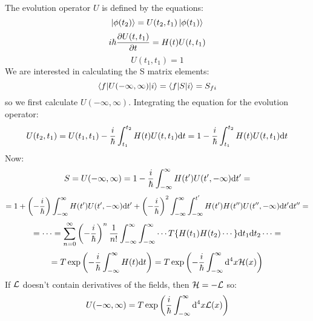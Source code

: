 The evolution operator $U$ is defined by the equations: 
\begin{equation*}
  \mathinner{|{\phi(t_2)}\rangle}=U(t_2, t_1)\mathinner{|{\phi(t_1)}\rangle}
\end{equation*}
\begin{equation*}
  i\hbar{\partial U(t, t_1)\over\partial t} = H(t)U(t, t_1)
\end{equation*}
\begin{equation*}
  U(t_1, t_1) = 1
\end{equation*}
We are interested in calculating the S matrix elements: 
\begin{equation*}
  \mathinner{\langle{f|U(-\infty,\infty)|i}\rangle}=\mathinner{\langle{f|S|i}\rangle}=S_{fi}
\end{equation*}
so we first calculate $U(-\infty,\infty)$. Integrating the equation for the evolution operator: 
\begin{equation*}
  U(t_2, t_1)=U(t_1, t_1)-{i\over\hbar}\int_{t_1}^{t_2} H(t)U(t, t_1){\rm d} t =1-{i\over\hbar}\int_{t_1}^{t_2} H(t)U(t, t_1){\rm d} t
\end{equation*}
Now: 
\begin{equation*}
  S=U(-\infty,\infty) =1-{i\over\hbar} \int_{-\infty}^{\infty} H(t')U(t', -\infty){\rm d} t'=
\end{equation*}
\begin{equation*}
  =1+\left(-{i\over\hbar}\right)\int_{-\infty}^{\infty} H(t')U(t', -\infty){\rm d} t' +\left(-{i\over\hbar}\right)^2\int_{-\infty}^{\infty} \int_{-\infty}^{t'} H(t')H(t'')U(t'', -\infty){\rm d} t'{\rm d} t''=
\end{equation*}
\begin{equation*}
  =\cdots= \sum_{n=0}^\infty \left(-{i\over\hbar}\right)^n {1\over n!} \int_{-\infty}^{\infty}\int_{-\infty}^{\infty}\cdots T\{H(t_1)H(t_2)\cdots\}{\rm d} t_1{\rm d} t_2\cdots=
\end{equation*}
\begin{equation*}
  = T\exp\left(-{i\over\hbar}\int_{-\infty}^{\infty}H(t){\rm d} t \right) = T\exp\left(-{i\over\hbar}\int_{-\infty}^{\infty}{\rm d}^4 x {\mathcal H}(x) \right)
\end{equation*}
If ${\mathcal L}$ doesn't contain derivatives of the fields, then ${\mathcal H} = -{\mathcal L}$ so: 
\begin{equation*}
  U(-\infty,\infty) = T\exp\left({i\over\hbar}\int_{-\infty}^{\infty}{\rm d}^4 x {\mathcal L}(x) \right)
\end{equation*}

